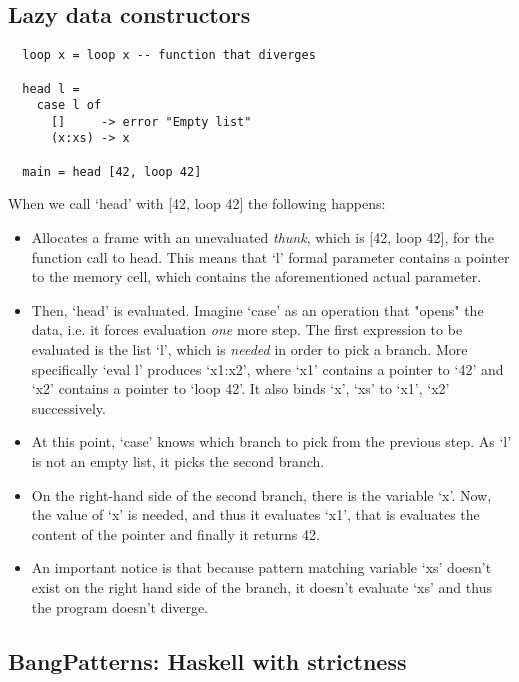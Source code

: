 \documentclass[diploma]{softlab-thesis}
\begin{document}
\subsection{Lazy data constructors}
\label{sec:lazy-data-cons}

\begin{verbatim}
  loop x = loop x -- function that diverges

  head l = 
    case l of 
      []     -> error "Empty list"
      (x:xs) -> x

  main = head [42, loop 42]
\end{verbatim}

When we call `head' with [42, loop 42] the following happens:
\begin {itemize}
  \item Allocates a frame with an unevaluated \textit{thunk}, which is [42, loop 42], for the function call to head.
  This means that `l' formal parameter contains a pointer to the memory cell, which contains the aforementioned actual parameter. 
  \item Then, `head' is evaluated. Imagine `case' as an operation that "opens" the data, i.e. it forces evaluation \textit{one} 
  more step. The first expression to be evaluated is the list `l', which is \textit{needed} in order to pick a branch. More 
  specifically `eval l' produces `x1:x2', where `x1' contains a pointer to `42' and `x2' contains a pointer to `loop 42'.
  It also binds `x', `xs' to `x1', `x2' successively.
  \item At this point, `case' knows which branch to pick from the previous step. As `l' is not an empty list, it picks the 
  second branch. 
  \item On the right-hand side of the second branch, there is the variable `x'. Now, the value of `x' is needed, and thus 
  it evaluates `x1', that is evaluates the content of the pointer and finally it returns 42.
  \item An important notice is that because pattern matching variable `xs' doesn't exist on the right hand side 
  of the branch, it doesn't evaluate `xs' and thus the program doesn't diverge.
\end{itemize}

\subsection{BangPatterns: Haskell with strictness}
\label{sec:bangpatterns}
\end{document}
